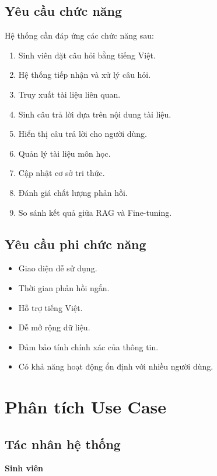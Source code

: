 \documentclass[12pt,a4paper]{report}
\begin{document}
	\subsection{Yêu cầu chức năng}
	
	Hệ thống cần đáp ứng các chức năng sau:
	
	\begin{enumerate}
		\item Sinh viên đặt câu hỏi bằng tiếng Việt.
		\item Hệ thống tiếp nhận và xử lý câu hỏi.
		\item Truy xuất tài liệu liên quan.
		\item Sinh câu trả lời dựa trên nội dung tài liệu.
		\item Hiển thị câu trả lời cho người dùng.
		\item Quản lý tài liệu môn học.
		\item Cập nhật cơ sở tri thức.
		\item Đánh giá chất lượng phản hồi.
		\item So sánh kết quả giữa RAG và Fine-tuning.
	\end{enumerate}
	
	\subsection{Yêu cầu phi chức năng}
	
	\begin{itemize}
		\item Giao diện dễ sử dụng.
		\item Thời gian phản hồi ngắn.
		\item Hỗ trợ tiếng Việt.
		\item Dễ mở rộng dữ liệu.
		\item Đảm bảo tính chính xác của thông tin.
		\item Có khả năng hoạt động ổn định với nhiều người dùng.
	\end{itemize}
	
	\section{Phân tích Use Case}
	
	\subsection{Tác nhân hệ thống}
	
	\textbf{Sinh viên}
	
\end{document}
